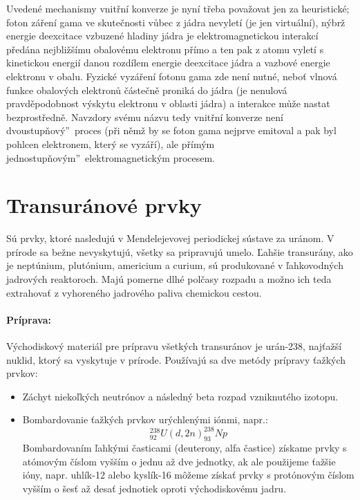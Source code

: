 \documentclass[../../main.tex]{subfiles}
\begin{document}
Uvedené mechanismy vnitřní konverze je nyní třeba považovat jen za heuristické; foton záření gama ve skutečnosti vůbec z jádra nevyletí (je jen virtuální), nýbrž energie deexcitace vzbuzené hladiny jádra je elektromagnetickou interakcí předána nejbližšímu obalovému elektronu přímo a ten pak z atomu vyletí s kinetickou energií danou rozdílem energie deexcitace jádra a vazbové energie elektronu v obalu. Fyzické vyzáření fotonu gama zde není nutné, neboť vlnová funkce obalových elektronů částečně proniká do jádra (je nenulová pravděpodobnost výskytu elektronu v oblasti jádra) a interakce může nastat bezprostředně. Navzdory svému názvu tedy vnitřní konverze není \quotedblbase dvoustupňový\textquotedblright ~proces (při němž by se foton gama nejprve emitoval a pak byl pohlcen elektronem, který se vyzáří), ale přímým \quotedblbase jednostupňovým\textquotedblright ~elektromagnetickým procesem.

\section{Transuránové prvky}
Sú prvky, ktoré nasledujú v Mendelejevovej periodickej sústave za uránom. V prírode sa bežne nevyskytujú, všetky sa pripravujú umelo. Ľahšie transurány, ako je neptúnium, plutónium, americium a curium, sú produkované v ľahkovodných jadrových reaktoroch. Majú pomerne dlhé polčasy rozpadu a možno ich teda extrahovať z vyhoreného jadrového paliva chemickou cestou.

\paragraph{Príprava:}
Východiskový materiál pre prípravu všetkých transuránov je urán-238, najťažší nuklid, ktorý sa vyskytuje v prírode. Používajú sa dve metódy prípravy ťažkých prvkov:
\begin{itemize}
\item Záchyt niekoľkých neutrónov a následný beta rozpad vzniknutého izotopu.
\item Bombardovanie ťažkých prvkov urýchlenými iónmi, napr.:
$$ ^{238}_{92}U (d,2n) ^{238}_{93}Np $$
Bombardovaním ľahkými časticami (deuterony, alfa častice) získame prvky s atómovým číslom vyšším o jednu až dve jednotky, ak ale použijeme ťažšie ióny, napr. uhlík-12 alebo kyslík-16 môžeme získať prvky s protónovým číslom vyšším o šesť až desať jednotiek oproti východiskovému jadru.

\end{itemize}
\end{document}
